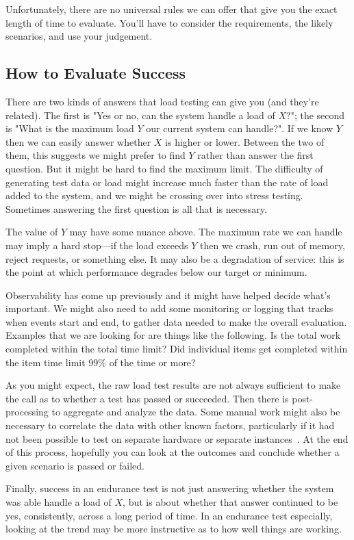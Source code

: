 Unfortunately, there are no universal rules we can offer that give you the exact length of time to evaluate. You'll have to consider the requirements, the likely scenarios, and use your judgement.

\subsection*{How to Evaluate Success}
There are two kinds of answers that load testing can give you (and they're related). The first is "Yes or no, can the system handle a load of $X$?"; the second is "What is the maximum load $Y$ our current system can handle?". If we know $Y$ then we can easily answer whether $X$ is higher or lower. Between the two of them, this suggests we might prefer to find $Y$ rather than answer the first question. But it might be hard to find the maximum limit. The difficulty of generating test data or load might increase much faster than the rate of load added to the system, and we might be crossing over into stress testing. Sometimes answering the first question is all that is necessary.

The value of $Y$ may have some nuance above. The maximum rate we can handle may imply a hard stop---if the load exceeds $Y$ then we crash, run out of memory, reject requests, or something else. It may also be a degradation of service: this is the point at which performance degrades below our target or minimum. 

Observability has come up previously and it might have helped decide what's important. We might also need to add some monitoring or logging that tracks when events start and end, to gather data needed to make the overall evaluation. Examples that we are looking for are things like the following. Is the total work completed within the total time limit? Did individual items get completed within the item time limit 99\% of the time or more? 

As you might expect, the raw load test results are not always sufficient to make the call as to whether a test has passed or succeeded. Then there is post-processing to aggregate and analyze the data. Some manual work might also be necessary to correlate the data with other known factors, particularly if it had not been possible to test on separate hardware or separate instances~\cite{hitchhiking}. At the end of this process, hopefully you can look at the outcomes and conclude whether a given scenario is passed or failed.

Finally, success in an endurance test is not just answering whether the system was able handle a load of $X$, but is about whether that answer continued to be yes, consistently, across a long period of time. In an endurance test especially, looking at the trend may be more instructive as to how well things are working.


